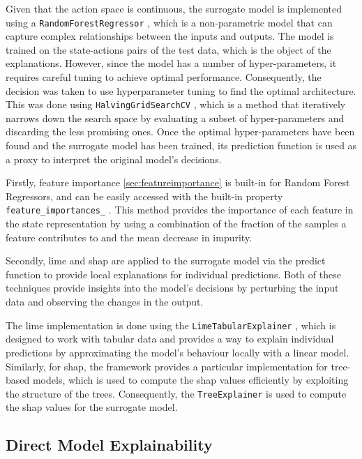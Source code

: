 Given that the action space is continuous, the surrogate model is implemented using a \texttt{RandomForestRegressor} \cite{sklearnRandomForest}, which is a non-parametric model that can capture complex relationships between the inputs and outputs. The model is trained on the state-actions pairs of the test data, which is the object of the explanations. However, since the model has a number of hyper-parameters, it requires careful tuning to achieve optimal performance. Consequently, the decision was taken to use hyperparameter tuning to find the optimal architecture. This was done using 
\texttt{HalvingGridSearchCV} \cite{sklearnHalvingGridSearch}, which is a method that iteratively narrows down the search space by evaluating a subset of hyper-parameters and discarding the less promising ones. Once the optimal hyper-parameters have been found and the surrogate model has been trained, its prediction function is used as a proxy to interpret the original model's decisions. 

Firstly, feature importance \ref{sec:featureimportance} is built-in for Random Forest Regressors, and can be easily accessed with the built-in property \texttt{feature\_importances\_} \cite{sklearnFeatureImportance}. This method provides the importance of each feature in the state representation by using a combination of the fraction of the samples a feature contributes to and the mean decrease in impurity.

Secondly, \acrshort{lime} and \acrshort{shap} are applied to the surrogate model via the predict function to provide local explanations for individual predictions. Both of these techniques provide insights into the model's decisions by perturbing the input data and observing the changes in the output. 

The \acrshort{lime} implementation is done using the \texttt{LimeTabularExplainer} \cite{LimeTabularExplainer}, which is designed to work with tabular data and provides a way to explain individual predictions by approximating the model's behaviour locally with a linear model. Similarly, for \acrshort{shap}, the framework provides a particular implementation for tree-based models, which is used to compute the \acrshort{shap} values efficiently by exploiting the structure of the trees. Consequently, the \texttt{TreeExplainer} \cite{ShapTreeExplainer} is used to compute the \acrshort{shap} values for the surrogate model.

\subsection{Direct Model Explainability} \label{subsec:direct_model_explainability}

